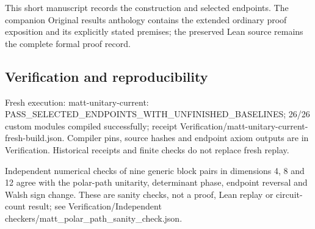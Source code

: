 \documentclass[11pt,a4paper]{article}
\begin{document}
{\small This short manuscript records the construction and selected endpoints. The companion Original results anthology contains the extended ordinary proof exposition and its explicitly stated premises; the preserved Lean source remains the complete formal proof record.\par}

\subsection{Verification and reproducibility}
Fresh execution: matt-unitary-current: PASS\_SELECTED\_ENDPOINTS\_WITH\_UNFINISHED\_BASELINES; 26/26 custom modules compiled successfully; receipt Verification/matt-unitary-current-fresh-build.json. Compiler pins, source hashes and endpoint axiom outputs are in Verification. Historical receipts and finite checks do not replace fresh replay.

{\small Independent numerical checks of nine generic block pairs in dimensions 4, 8 and 12 agree with the polar-path unitarity, determinant phase, endpoint reversal and Walsh sign change. These are sanity checks, not a proof, Lean replay or circuit-count result; see Verification/Independent checkers/matt\_polar\_path\_sanity\_check.json.\par}
\end{document}
